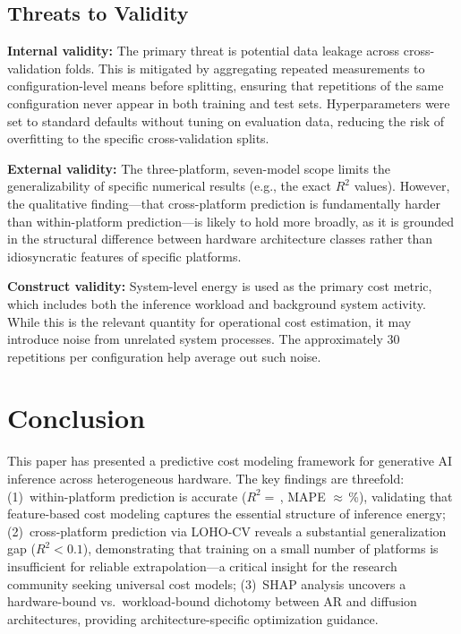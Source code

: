 \documentclass[review,12pt,authoryear]{elsarticle}
\begin{document}
\subsection{Threats to Validity}
\label{sec:threats}

\textbf{Internal validity:}
The primary threat is potential data leakage across cross-validation folds.
This is mitigated by aggregating repeated measurements to configuration-level means before splitting, ensuring that repetitions of the same configuration never appear in both training and test sets.
Hyperparameters were set to standard defaults without tuning on evaluation data, reducing the risk of overfitting to the specific cross-validation splits.

\textbf{External validity:}
The three-platform, seven-model scope limits the generalizability of specific numerical results (e.g., the exact $R^2$ values).
However, the qualitative finding---that cross-platform prediction is fundamentally harder than within-platform prediction---is likely to hold more broadly, as it is grounded in the structural difference between hardware architecture classes rather than idiosyncratic features of specific platforms.

\textbf{Construct validity:}
System-level energy is used as the primary cost metric, which includes both the inference workload and background system activity.
While this is the relevant quantity for operational cost estimation, it may introduce noise from unrelated system processes.
The approximately 30 repetitions per configuration help average out such noise.


\section{Conclusion}
\label{sec:conclusion}

This paper has presented a predictive cost modeling framework for generative AI inference across heterogeneous hardware.
The key findings are threefold:
(1)~within-platform prediction is accurate ($R^2 {=}$\,\unskip, MAPE ${\approx}$\,\unskip\%), validating that feature-based cost modeling captures the essential structure of inference energy;
(2)~cross-platform prediction via LOHO-CV reveals a substantial generalization gap ($R^2 {<} 0.1$), demonstrating that training on a small number of platforms is insufficient for reliable extrapolation---a critical insight for the research community seeking universal cost models;
(3)~SHAP analysis uncovers a hardware-bound vs.\ workload-bound dichotomy between AR and diffusion architectures, providing architecture-specific optimization guidance.
\end{document}
